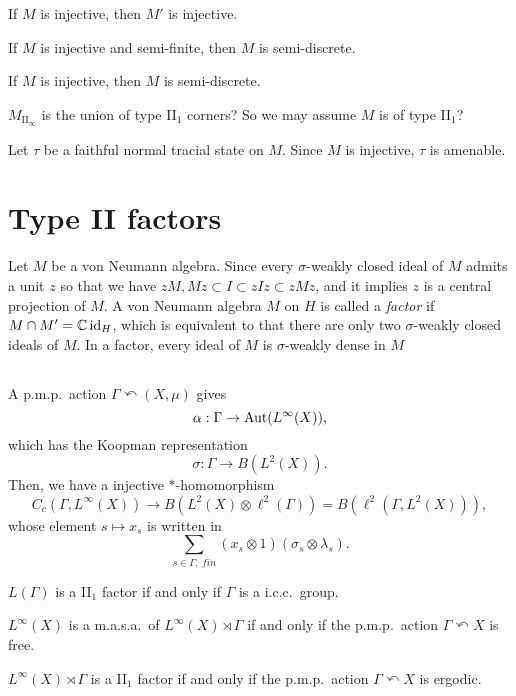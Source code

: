 \documentclass{../../large}
\begin{document}
\begin{prb}
\begin{parts}
\item If $M$ is injective, then $M'$ is injective.
\item If $M$ is injective and semi-finite, then $M$ is semi-discrete.
\item If $M$ is injective, then $M$ is semi-discrete.
\end{parts}
\end{prb}
\begin{pf}
$M_{\mathrm{II}_\infty}$ is the union of type II$_1$ corners?
So we may assume $M$ is of type II$_1$?

Let $\tau$ be a faithful normal tracial state on $M$.
Since $M$ is injective, $\tau$ is amenable.
\end{pf}

\chapter{Type II factors}

\begin{prb}
Let $M$ be a von Neumann algebra.
Since every $\sigma$-weakly closed ideal of $M$ admits a unit $z$ so that we have $zM,Mz\subset I\subset zIz\subset zMz$, and it implies $z$ is a central projection of $M$.
A von Neumann algebra $M$ on $H$ is called a \emph{factor} if $M\cap M'=\mathbb{C}\operatorname{id}_H$, which is equivalent to that there are only two $\sigma$-weakly closed ideals of $M$.
In a factor, every ideal of $M$ is $\sigma$-weakly dense in $M$
\end{prb}


\section{}
\begin{prb}
A p.m.p.~action $\Gamma\curvearrowleft(X,\mu)$ gives
\[\alpha:\Gamma\to\operatorname{Aut}(L^\infty(X)),\]
which has the Koopman representation
\[\sigma:\Gamma\to B(L^2(X)).\]
Then, we have a injective $*$-homomorphism
\[C_c(\Gamma,L^\infty(X))\to B(L^2(X)\otimes\ell^2(\Gamma))=B(\ell^2(\Gamma,L^2(X))),\]
whose element $s\mapsto x_s$ is written in
\[\sum_{s\in\Gamma,\ fin}(x_s\otimes1)(\sigma_s\otimes\lambda_s).\]

\begin{parts}
\item $L(\Gamma)$ is a II$_1$ factor if and only if $\Gamma$ is a i.c.c.~group.
\item $L^\infty(X)$ is a m.a.s.a.~of $L^\infty(X)\rtimes\Gamma$ if and only if the p.m.p.~action $\Gamma\curvearrowleft X$ is free.
\item $L^\infty(X)\rtimes\Gamma$ is a II$_1$ factor if and only if the p.m.p.~action $\Gamma\curvearrowleft X$ is ergodic.
\end{parts}
\end{prb}
\end{document}
